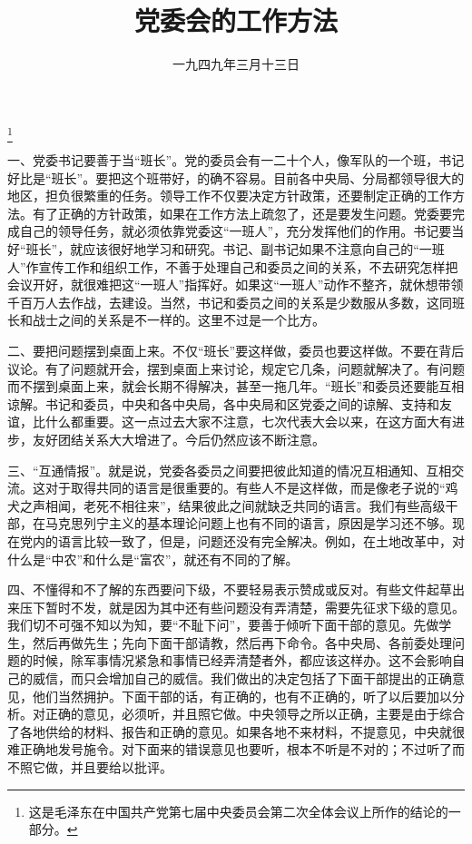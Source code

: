 
\title{党委会的工作方法}
\date{一九四九年三月十三日}
\thanks{这是毛泽东在中国共产党第七届中央委员会第二次全体会议上所作的结论的一部分。}
\maketitle


一、党委书记要善于当“班长”。党的委员会有一二十个人，像军队的一个班，书记好比是“班长”。要把这个班带好，的确不容易。目前各中央局、分局都领导很大的地区，担负很繁重的任务。领导工作不仅要决定方针政策，还要制定正确的工作方法。有了正确的方针政策，如果在工作方法上疏忽了，还是要发生问题。党委要完成自己的领导任务，就必须依靠党委这“一班人”，充分发挥他们的作用。书记要当好“班长”，就应该很好地学习和研究。书记、副书记如果不注意向自己的“一班人”作宣传工作和组织工作，不善于处理自己和委员之间的关系，不去研究怎样把会议开好，就很难把这“一班人”指挥好。如果这“一班人”动作不整齐，就休想带领千百万人去作战，去建设。当然，书记和委员之间的关系是少数服从多数，这同班长和战士之间的关系是不一样的。这里不过是一个比方。

二、要把问题摆到桌面上来。不仅“班长”要这样做，委员也要这样做。不要在背后议论。有了问题就开会，摆到桌面上来讨论，规定它几条，问题就解决了。有问题而不摆到桌面上来，就会长期不得解决，甚至一拖几年。“班长”和委员还要能互相谅解。书记和委员，中央和各中央局，各中央局和区党委之间的谅解、支持和友谊，比什么都重要。这一点过去大家不注意，七次代表大会以来，在这方面大有进步，友好团结关系大大增进了。今后仍然应该不断注意。

三、“互通情报”。就是说，党委各委员之间要把彼此知道的情况互相通知、互相交流。这对于取得共同的语言是很重要的。有些人不是这样做，而是像老子说的“鸡犬之声相闻，老死不相往来”，结果彼此之间就缺乏共同的语言。我们有些高级干部，在马克思列宁主义的基本理论问题上也有不同的语言，原因是学习还不够。现在党内的语言比较一致了，但是，问题还没有完全解决。例如，在土地改革中，对什么是“中农”和什么是“富农”，就还有不同的了解。

四、不懂得和不了解的东西要问下级，不要轻易表示赞成或反对。有些文件起草出来压下暂时不发，就是因为其中还有些问题没有弄清楚，需要先征求下级的意见。我们切不可强不知以为知，要“不耻下问”，要善于倾听下面干部的意见。先做学生，然后再做先生；先向下面干部请教，然后再下命令。各中央局、各前委处理问题的时候，除军事情况紧急和事情已经弄清楚者外，都应该这样办。这不会影响自己的威信，而只会增加自己的威信。我们做出的决定包括了下面干部提出的正确意见，他们当然拥护。下面干部的话，有正确的，也有不正确的，听了以后要加以分析。对正确的意见，必须听，并且照它做。中央领导之所以正确，主要是由于综合了各地供给的材料、报告和正确的意见。如果各地不来材料，不提意见，中央就很难正确地发号施令。对下面来的错误意见也要听，根本不听是不对的；不过听了而不照它做，并且要给以批评。


